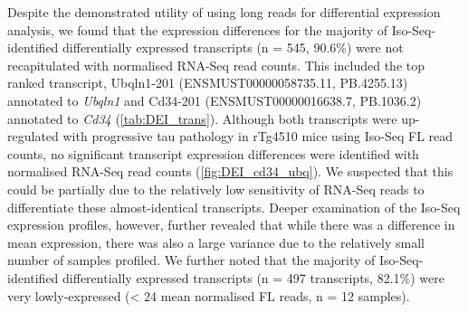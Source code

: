 Despite the demonstrated utility of using long reads for differential expression analysis, we found that the expression differences for the majority of Iso-Seq-identified differentially expressed transcripts (n = 545, 90.6\%) were not recapitulated with normalised RNA-Seq read counts. This included the top ranked transcript, Ubqln1-201 (ENSMUST00000058735.11, PB.4255.13) annotated to \textit{Ubqln1} and Cd34-201 (ENSMUST00000016638.7, PB.1036.2) annotated to \textit{Cd34} (\cref{tab:DEI_trans}). Although both transcripts were up-regulated with progressive tau pathology in rTg4510 mice using Iso-Seq FL read counts, no significant transcript expression differences were identified with normalised RNA-Seq read counts (\cref{fig:DEI_cd34_ubq}). We suspected that this could be partially due to the relatively low sensitivity of RNA-Seq reads to differentiate these almost-identical transcripts. Deeper examination of the Iso-Seq expression profiles, however, further revealed that while there was a difference in mean expression, there was also a large variance due to the relatively small number of samples profiled. We further noted that the majority of Iso-Seq-identified differentially expressed transcripts (n = 497 transcripts, 82.1\%) were very lowly-expressed (< 24 mean normalised FL reads, n = 12 samples). 

